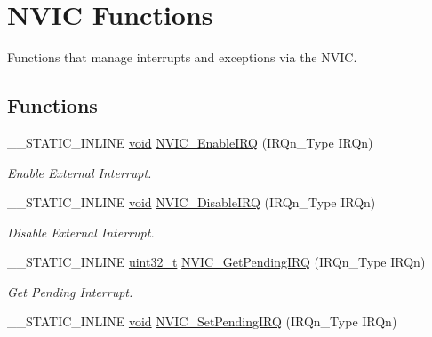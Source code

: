 \hypertarget{group___c_m_s_i_s___core___n_v_i_c_functions}{\section{N\-V\-I\-C Functions}
\label{group___c_m_s_i_s___core___n_v_i_c_functions}
}


Functions that manage interrupts and exceptions via the N\-V\-I\-C.  


\subsection*{Functions}
\begin{DoxyCompactItemize}
\item 
\-\_\-\-\_\-\-S\-T\-A\-T\-I\-C\-\_\-\-I\-N\-L\-I\-N\-E \hyperlink{group___n_a_m_e_ga18028b8badbf1ea7e704ccac3c488e82}{void} \hyperlink{group___c_m_s_i_s___core___n_v_i_c_functions_ga3349f2e3580d7ce22d6530b7294e5921}{N\-V\-I\-C\-\_\-\-Enable\-I\-R\-Q} (I\-R\-Qn\-\_\-\-Type I\-R\-Qn)
\begin{DoxyCompactList}\small\item\em Enable External Interrupt. \end{DoxyCompactList}\item 
\-\_\-\-\_\-\-S\-T\-A\-T\-I\-C\-\_\-\-I\-N\-L\-I\-N\-E \hyperlink{group___n_a_m_e_ga18028b8badbf1ea7e704ccac3c488e82}{void} \hyperlink{group___c_m_s_i_s___core___n_v_i_c_functions_ga260fba04ac8346855c57f091d4ee1e71}{N\-V\-I\-C\-\_\-\-Disable\-I\-R\-Q} (I\-R\-Qn\-\_\-\-Type I\-R\-Qn)
\begin{DoxyCompactList}\small\item\em Disable External Interrupt. \end{DoxyCompactList}\item 
\-\_\-\-\_\-\-S\-T\-A\-T\-I\-C\-\_\-\-I\-N\-L\-I\-N\-E \hyperlink{stdint_8h_a435d1572bf3f880d55459d9805097f62}{uint32\-\_\-t} \hyperlink{group___c_m_s_i_s___core___n_v_i_c_functions_gafec8042db64c0f8ed432b6c8386a05d8}{N\-V\-I\-C\-\_\-\-Get\-Pending\-I\-R\-Q} (I\-R\-Qn\-\_\-\-Type I\-R\-Qn)
\begin{DoxyCompactList}\small\item\em Get Pending Interrupt. \end{DoxyCompactList}\item 
\-\_\-\-\_\-\-S\-T\-A\-T\-I\-C\-\_\-\-I\-N\-L\-I\-N\-E \hyperlink{group___n_a_m_e_ga18028b8badbf1ea7e704ccac3c488e82}{void} \hyperlink{group___c_m_s_i_s___core___n_v_i_c_functions_ga3ecf446519da33e1690deffbf5be505f}{N\-V\-I\-C\-\_\-\-Set\-Pending\-I\-R\-Q} (I\-R\-Qn\-\_\-\-Type I\-R\-Qn)

\end{DoxyCompactItemize}
